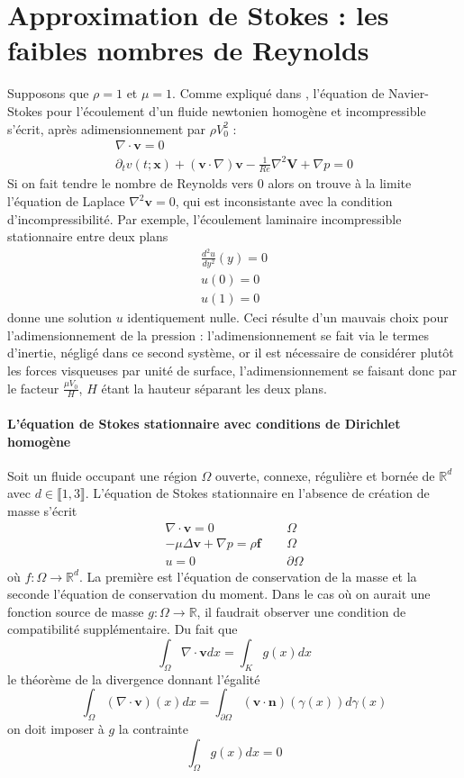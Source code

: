 \section{Approximation de Stokes : les faibles nombres de Reynolds}

Supposons que $\rho = 1$ et $\mu = 1$. Comme expliqué dans \cite{jpc}, l'équation de Navier-Stokes pour l'écoulement d'un fluide newtonien homogène et incompressible s'écrit, après adimensionnement par $\rho V_0^2$ : 
\begin{align*}
    \nabla \cdot \mathbf{v} = 0 \\
    \partial_t v(t; \mathbf{x}) + \left( \mathbf{v} \cdot \nabla \right) \mathbf{v} - \frac{1}{Re} \nabla^2 \mathbf{V} + \nabla p = 0
\end{align*}
Si on fait tendre le nombre de Reynolds vers 0 alors on trouve à la limite l'équation de Laplace $\nabla^2 \mathbf{v} = 0$, qui est inconsistante avec la condition d'incompressibilité. Par exemple, l'écoulement laminaire incompressible stationnaire entre deux plans
\begin{align*}
    \frac{d^2 u}{dy^2}(y) = 0 \\
    u(0) = 0 \\
    u(1) = 0
\end{align*}
donne une solution $u$ identiquement nulle. Ceci résulte d'un mauvais choix pour l'adimensionnement de la pression : l'adimensionnement se fait via le termes d'inertie, négligé dans ce second système, or il est nécessaire de considérer plutôt les forces visqueuses par unité de surface, l'adimensionnement se faisant donc par le facteur $\frac{\mu V_0}{H}$, $H$ étant la hauteur séparant les deux plans.

\paragraph{L'équation de Stokes stationnaire avec conditions de Dirichlet homogène} Soit un fluide occupant une région $\Omega$ ouverte, connexe, régulière et bornée de $\mathbb{R}^d$ avec $d \in \llbracket 1, 3\rrbracket$. L'équation de Stokes stationnaire en l'absence de création de masse s'écrit
\begin{align*}
    \nabla \cdot \mathbf{v} = 0 & \hspace{15pt} \Omega \\
    -\mu \Delta \mathbf{v} + \nabla p = \rho \mathbf{f} & \hspace{15pt} \Omega \\
    u = 0 & \hspace{15pt} \partial \Omega
\end{align*}
où $f : \Omega \rightarrow \mathbb{R}^d$. La première est l'équation de conservation de la masse et la seconde l'équation de conservation du moment. Dans le cas où on aurait une fonction source de masse $g : \Omega \rightarrow \mathbb{R}$, il faudrait observer une condition de compatibilité supplémentaire. Du fait que $$ \int_\Omega \nabla \cdot \mathbf{v} dx = \int_K g(x) dx $$ le théorème de la divergence donnant l'égalité $$ \int_\Omega (\nabla \cdot \mathbf{v})(x) dx = \int_{\partial \Omega} (\mathbf{v} \cdot \mathbf{n})(\gamma(x)) d\gamma(x) $$ on doit imposer à $g$ la contrainte $$ \int_\Omega g(x) dx = 0 $$

